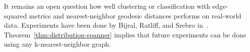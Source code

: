 It remains an open question how well clustering or
classification with
edge-squared metrics and nearest-neighbor geodesic distances performs on real-world
data.
Experiments have been done by Bijral, Ratliff, and
Srebro in~\cite{bijral11semiSupLearningDBD}.
Theorem~\ref{thm:distribution-spanner} implies that future experiments
can be done using any
k-nearest-neighbor graph.


